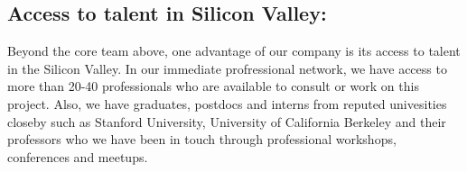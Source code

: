 \subsection*{Access to talent in Silicon Valley:}
Beyond the core team above, one advantage of our company is its access to talent in the Silicon Valley. In our
immediate profressional network, we have access to more than 20-40 professionals who are available to consult or work on
this project. Also, we have graduates, postdocs and  interns from reputed univesities closeby such as Stanford
University, University of California Berkeley and their professors who we have been in touch through professional
workshops, conferences and meetups.
